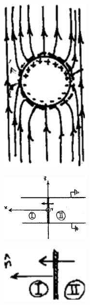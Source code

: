 \documentclass[10pt,oneside]{CBFT_book}
\begin{document}
\begin{figure}[htb]
	\begin{center}
	\includegraphics[width=0.4\textwidth]{images/fig_ft1_perturbacion3.pdf}	 
	\end{center}
	\caption{}
\end{figure} 

\begin{figure}[htb]
	\begin{center}
	\includegraphics[width=0.4\textwidth]{images/fig_ft1_potencial.pdf}	 
	\end{center}
	\caption{}
\end{figure} 

\begin{figure}[htb]
	\begin{center}
	\includegraphics[width=0.4\textwidth]{images/fig_ft1_potencialsketch.pdf}	 
	\end{center}
	\caption{}
\end{figure} 
\end{document}
